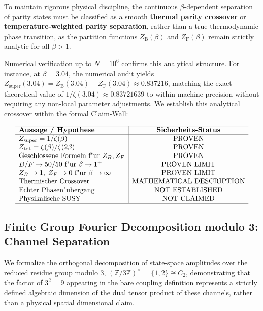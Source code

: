 \documentclass[11pt,a4paper]{article}
\theoremstyle{definition}
\begin{document}
	To maintain rigorous physical discipline, the continuous $\beta$-dependent separation of parity states must be classified as a smooth \textbf{thermal parity crossover} or \textbf{temperature-weighted parity separation}, rather than a true thermodynamic phase transition, as the partition functions $Z_{\text{B}}(\beta)$ and $Z_{\text{F}}(\beta)$ remain strictly analytic for all $\beta > 1$.
	
	Numerical verification up to $N=10^6$ confirms this analytical structure. For instance, at $\beta = 3.04$, the numerical audit yields $Z_{\text{super}}(3.04) = Z_{\text{B}}(3.04) - Z_{\text{F}}(3.04) \approx 0.837216$, matching the exact theoretical value of $1/\zeta(3.04) \approx 0.83721639$ to within machine precision without requiring any non-local parameter adjustments. We establish this analytical crossover within the formal Claim-Wall:
	
	\begin{equation}
		\begin{array}{l|c}
			\hline
			\textbf{Aussage / Hypothese} & \textbf{Sicherheits-Status} \\
			\hline
			Z_{\rm super}=1/\zeta(\beta) & \mathrm{PROVEN} \\
			Z_{\rm tot}=\zeta(\beta)/\zeta(2\beta) & \mathrm{PROVEN} \\
			\text{Geschlossene Formeln f"ur } Z_B, Z_F & \mathrm{PROVEN} \\
			B/F \to 50/50 \text{ f"ur } \beta \to 1^+ & \mathrm{PROVEN\ LIMIT} \\
			Z_B \to 1, \; Z_F \to 0 \text{ f"ur } \beta \to \infty & \mathrm{PROVEN\ LIMIT} \\
			\text{Thermischer Crossover} & \mathrm{MATHEMATICAL\ DESCRIPTION} \\
			\text{Echter Phasen"ubergang} & \mathrm{NOT\ ESTABLISHED} \\
			\text{Physikalische SUSY} & \mathrm{NOT\ CLAIMED} \\
			\hline
		\end{array}
	\end{equation}
	
	\subsection{Finite Group Fourier Decomposition modulo 3: Channel Separation}
	\label{subsec:mod3_fourier}
	We formalize the orthogonal decomposition of state-space amplitudes over the reduced residue group modulo $3$, $(\mathbb{Z}/3\mathbb{Z})^\times = \{1, 2\} \cong C_2$, demonstrating that the factor of $3^2 = 9$ appearing in the bare coupling definition represents a strictly defined algebraic dimension of the dual tensor product of these channels, rather than a physical spatial dimensional claim.
	
\end{document}
